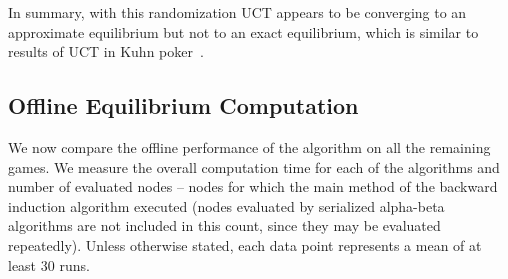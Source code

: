In summary, with this randomization UCT appears to be converging to an approximate equilibrium but not to an
exact equilibrium, which is similar to results of UCT in Kuhn poker~\cite{Ponsen11Computing}.



\subsection{Offline Equilibrium Computation} \label{sec:eval:offline}

We now compare the offline performance of the algorithm on all the remaining games.
We measure the overall computation time for each of the algorithms and number of evaluated nodes -- \ie nodes for which the main method of the backward induction algorithm executed (\ie nodes evaluated by serialized alpha-beta algorithms are not included in this count, since they may be evaluated repeatedly).
Unless otherwise stated, each data point represents a mean of at least $30$ runs.

